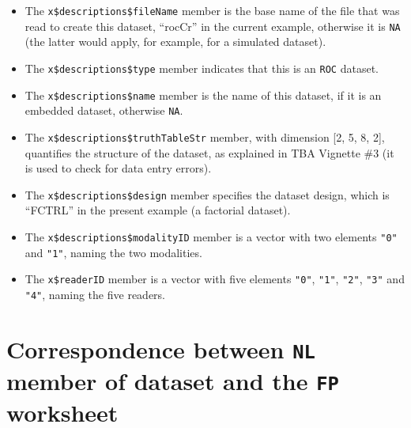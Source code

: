 \documentclass[
]{book}
\providecommand{\tightlist}{%
  \setlength{\itemsep}{0pt}\setlength{\parskip}{0pt}}
\begin{document}
\begin{itemize}
  \begin{itemize}
  \tightlist
  \item
    The \texttt{x\$descriptions\$fileName} member is the base name of the file that was read to create this dataset, ``rocCr'' in the current example, otherwise it is \texttt{NA} (the latter would apply, for example, for a simulated dataset).
  \item
    The \texttt{x\$descriptions\$type} member indicates that this is an \texttt{ROC} dataset.
  \item
    The \texttt{x\$descriptions\$name} member is the name of this dataset, if it is an embedded dataset, otherwise \texttt{NA}.
  \item
    The \texttt{x\$descriptions\$truthTableStr} member, with dimension {[}2, 5, 8, 2{]}, quantifies the structure of the dataset, as explained in TBA Vignette \#3 (it is used to check for data entry errors).
  \item
    The \texttt{x\$descriptions\$design} member specifies the dataset design, which is ``FCTRL'' in the present example (a factorial dataset).
  \item
    The \texttt{x\$descriptions\$modalityID} member is a vector with two elements \texttt{"0"} and \texttt{"1"}, naming the two modalities.
  \item
    The \texttt{x\$readerID} member is a vector with five elements \texttt{"0"}, \texttt{"1"}, \texttt{"2"}, \texttt{"3"} and \texttt{"4"}, naming the five readers.
  \end{itemize}
\end{itemize}

\hypertarget{quick-start-read-datafile-correspondence-nl-fp}{%
\section{\texorpdfstring{Correspondence between \texttt{NL} member of dataset and the \texttt{FP} worksheet}{Correspondence between NL member of dataset and the FP worksheet}}\label{quick-start-read-datafile-correspondence-nl-fp}}
\end{document}
